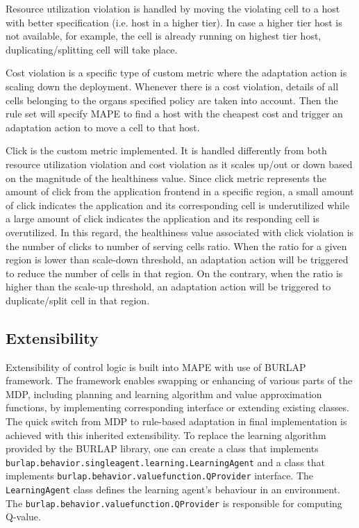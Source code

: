 \documentclass{seal_thesis}
\begin{document}
Resource utilization violation is handled by moving the violating cell to a host with better specification (i.e. host in a higher tier).
In case a higher tier host is not available, for example, the cell is already running on highest tier host, duplicating/splitting cell will take place.

Cost violation is a specific type of custom metric where the adaptation action is scaling down the deployment.
Whenever there is a cost violation, details of all cells belonging to the organs specified policy are taken into account.
Then the rule set will specify MAPE to find a host with the cheapest cost and trigger an adaptation action to move a cell to that host.

Click is the custom metric implemented.
It is handled differently from both resource utilization violation and cost violation as it scales up/out or down based on the magnitude of the healthiness value.
Since click metric represents the amount of click from the application frontend in a specific region, a small amount of click indicates the application and its corresponding cell is underutilized while a large amount of click indicates the application and its responding cell is overutilized.
In this regard, the healthiness value associated with click violation is the number of clicks to number of serving cells ratio.
When the ratio for a given region is lower than scale-down threshold, an adaptation action will be triggered to reduce the number of cells in that region.
On the contrary, when the ratio is higher than the scale-up threshold, an adaptation action will be triggered to duplicate/split cell in that region.

\subsection{Extensibility}\label{sec:mdpext}
\begin{sloppypar}
Extensibility of control logic is built into MAPE with use of BURLAP framework.
The framework enables swapping or enhancing of various parts of the MDP, including planning and learning algorithm and value approximation functions, by implementing corresponding interface or extending existing classes.
The quick switch from MDP to rule-based adaptation in final implementation is achieved with this inherited extensibility.
To replace the learning algorithm provided by the BURLAP library, one can create a class that implements \texttt{burlap.behavior.singleagent.learning.LearningAgent} and a class that implements \texttt{burlap.behavior.valuefunction.QProvider} interface.
The \texttt{LearningAgent} class defines the learning agent's behaviour in an environment.
The \texttt{burlap.behavior.valuefunction.QProvider} is responsible for computing Q-value.
\end{sloppypar}
\end{document}
